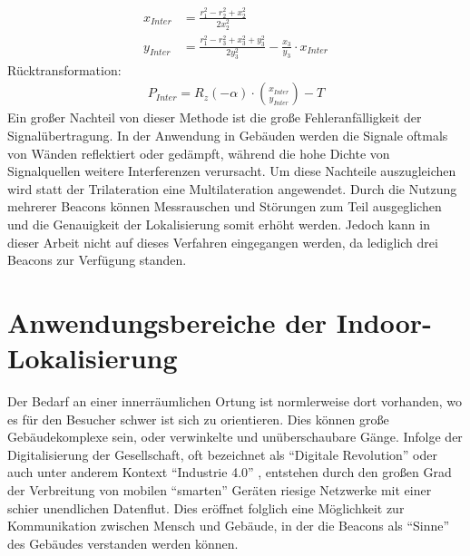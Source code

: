 \begin{align*}
x_{Inter} &= \frac{r_1^2-r_2^2+x_2^2}{2x_2^2}\\
y_{Inter} &= \frac{r_1^2-r_3^2+x_3^2+y_3^2}{2y_3^2}-\frac{x_3}{y_3}\cdot x_{Inter}
\end{align*}
Rücktransformation:
\begin{align*}
P_{Inter} = R_z\left ( -\alpha \right ) \cdot \binom{x_{Inter}}{y_{Inter}} - T
\end{align*}
Ein großer Nachteil von dieser Methode ist die große Fehleranfälligkeit der Signalübertragung. In der Anwendung in Gebäuden werden die Signale oftmals von Wänden reflektiert oder gedämpft, während die hohe Dichte von Signalquellen weitere Interferenzen verursacht. Um diese Nachteile auszugleichen wird statt der Trilateration eine Multilateration angewendet. Durch die Nutzung mehrerer Beacons können Messrauschen und Störungen zum Teil ausgeglichen und die Genauigkeit der Lokalisierung somit erhöht werden. Jedoch kann in dieser Arbeit nicht auf dieses Verfahren eingegangen werden, da lediglich drei Beacons zur Verfügung standen. 

\section{Anwendungsbereiche der Indoor-Lokalisierung}
Der Bedarf an einer innerräumlichen Ortung ist normlerweise dort vorhanden, wo es für den Besucher schwer ist sich zu orientieren. Dies können große Gebäudekomplexe sein, oder verwinkelte und unüberschaubare Gänge. Infolge der Digitalisierung der Gesellschaft, oft bezeichnet als "`Digitale Revolution"' oder auch unter anderem Kontext "`Industrie 4.0"' \cite{DigRev}, entstehen durch den großen Grad der Verbreitung von mobilen "`smarten"' Geräten riesige Netzwerke mit einer schier unendlichen Datenflut. Dies eröffnet folglich eine Möglichkeit zur Kommunikation zwischen Mensch und Gebäude, in der die Beacons als "`Sinne"' des Gebäudes verstanden werden können.  
